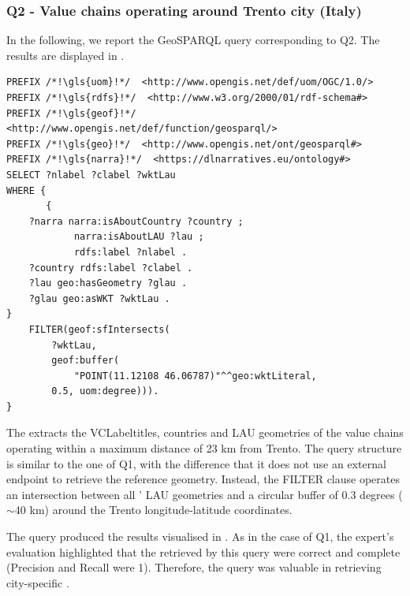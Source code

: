 \subsubsection*{Q2 - Value chains operating around Trento city (Italy)}
In the following, we report the GeoSPARQL query corresponding to Q2. The results are displayed in .

\begin{lstlisting}[caption=GeoSPARQL Query 2, label={lst:query2}]
PREFIX /*!\gls{uom}!*/  <http://www.opengis.net/def/uom/OGC/1.0/>
PREFIX /*!\gls{rdfs}!*/  <http://www.w3.org/2000/01/rdf-schema#>
PREFIX /*!\gls{geof}!*/  <http://www.opengis.net/def/function/geosparql/> 
PREFIX /*!\gls{geo}!*/  <http://www.opengis.net/ont/geosparql#>
PREFIX /*!\gls{narra}!*/  <https://dlnarratives.eu/ontology#>
SELECT ?nlabel ?clabel ?wktLau
WHERE { 
       {
    ?narra narra:isAboutCountry ?country ;
            narra:isAboutLAU ?lau ;
            rdfs:label ?nlabel .
    ?country rdfs:label ?clabel .
    ?lau geo:hasGeometry ?glau .
    ?glau geo:asWKT ?wktLau .
}
    FILTER(geof:sfIntersects(
        ?wktLau,
        geof:buffer(
            "POINT(11.12108 46.06787)"^^geo:wktLiteral,
        0.5, uom:degree))). 
}
\end{lstlisting}

The  extracts the \acrshort{VCLabel}titles, countries and LAU geometries of the value chains operating within a maximum distance of 23 km from Trento. The query structure is similar to the one of Q1, with the difference that it does not use an external endpoint to retrieve the reference geometry. Instead, the FILTER clause operates an intersection between all ' LAU geometries and a circular buffer of 0.3 degrees ($\sim$40 km) around the Trento longitude-latitude coordinates. 

The query produced the results visualised in . As in the case of Q1, the expert's evaluation highlighted that the  retrieved by this query were correct and complete (Precision and Recall were 1). Therefore, the query was valuable in retrieving city-specific .


